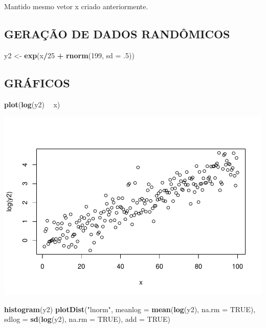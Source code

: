 \documentclass[]{article}
\newenvironment{Shaded}{\begin{snugshade}}{\end{snugshade}}
\newcommand{\KeywordTok}[1]{\textcolor[rgb]{0.13,0.29,0.53}{\textbf{#1}}}
\newcommand{\DataTypeTok}[1]{\textcolor[rgb]{0.13,0.29,0.53}{#1}}
\newcommand{\DecValTok}[1]{\textcolor[rgb]{0.00,0.00,0.81}{#1}}
\newcommand{\StringTok}[1]{\textcolor[rgb]{0.31,0.60,0.02}{#1}}
\newcommand{\OtherTok}[1]{\textcolor[rgb]{0.56,0.35,0.01}{#1}}
\newcommand{\OperatorTok}[1]{\textcolor[rgb]{0.81,0.36,0.00}{\textbf{#1}}}
\newcommand{\NormalTok}[1]{#1}
\begin{document}
Mantido mesmo vetor x criado anteriormente.

\subsection{GERAÇÃO DE DADOS
RANDÔMICOS}\label{geracao-de-dados-randomicos-2}

\begin{Shaded}
\begin{Highlighting}[]
\NormalTok{y2 <-}\StringTok{ }\KeywordTok{exp}\NormalTok{(x}\OperatorTok{/}\DecValTok{25} \OperatorTok{+}\StringTok{ }\KeywordTok{rnorm}\NormalTok{(}\DecValTok{199}\NormalTok{, }\DataTypeTok{sd =}\NormalTok{ .}\DecValTok{5}\NormalTok{)) }
\end{Highlighting}
\end{Shaded}

\subsection{GRÁFICOS}\label{graficos-2}

\begin{Shaded}
\begin{Highlighting}[]
\KeywordTok{plot}\NormalTok{(}\KeywordTok{log}\NormalTok{(y2) }\OperatorTok{~}\StringTok{ }\NormalTok{x)}
\end{Highlighting}
\end{Shaded}

\includegraphics{Impacto_sigma_files/figure-latex/unnamed-chunk-11-1.pdf}

\begin{Shaded}
\begin{Highlighting}[]
\KeywordTok{histogram}\NormalTok{(y2)}
\KeywordTok{plotDist}\NormalTok{(}\StringTok{"lnorm"}\NormalTok{, }
         \DataTypeTok{meanlog =} \KeywordTok{mean}\NormalTok{(}\KeywordTok{log}\NormalTok{(y2), }\DataTypeTok{na.rm =} \OtherTok{TRUE}\NormalTok{),}
         \DataTypeTok{sdlog =} \KeywordTok{sd}\NormalTok{(}\KeywordTok{log}\NormalTok{(y2), }\DataTypeTok{na.rm =} \OtherTok{TRUE}\NormalTok{), }
         \DataTypeTok{add =} \OtherTok{TRUE}\NormalTok{)}
\end{Highlighting}
\end{Shaded}
\end{document}

